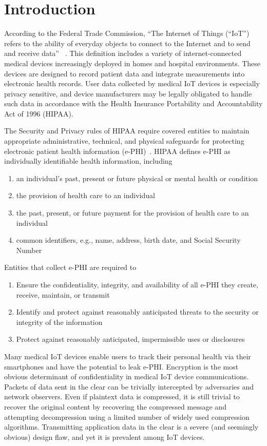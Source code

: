 \section{Introduction}

According to the Federal Trade Commission, ``The Internet of Things (``IoT'') refers to the ability of everyday objects to connect to the Internet and to send and receive data'' ~\cite{ftc}. This definition includes a variety of internet-connected medical devices increasingly deployed in homes and hospital environments. These devices are designed to record patient data and integrate measurements into electronic health records. User data collected by medical IoT devices is especially privacy sensitive, and device manufacturers may be legally obligated to handle such data in accordance with the Health Insurance Portability and Accountability Act of 1996 (HIPAA). 

The Security and Privacy rules of HIPAA require covered entities to maintain appropriate administrative, technical, and physical safeguards for protecting electronic patient health information (e-PHI)~\cite{securityHIPAArule, privacyHIPAArule}. HIPAA defines e-PHI as individually identifiable health information, including
\begin{enumerate}
  \item an individual's past, present or future physical or mental health or condition
  \item the provision of health care to an individual
  \item the past, present, or future payment for the provision of health care to an individual
  \item common identifiers, e.g., name, address, birth date, and  Social Security Number
\end{enumerate}
Entities that collect e-PHI are required to 
\begin{enumerate}
  \item Ensure the confidentiality, integrity, and availability of all e-PHI they create, receive, maintain, or transmit
  \item Identify and protect against reasonably anticipated threats to the security or integrity of the information
  \item Protect against reasonably anticipated, impermissible uses or disclosures
\end{enumerate}

Many medical IoT devices enable users to track their personal health via their smartphones and have the potential to leak e-PHI. 
Encryption is the most obvious determinant of confidentiality in medical IoT device communications. Packets of data sent in the clear can be trivially intercepted by adversaries and network observers. Even if plaintext data is compressed, it is still trivial to recover the original content by recovering the compressed message and attempting decompression using a limited number of widely used compression algorithms. Transmitting application data in the clear is a severe (and seemingly obvious) design flaw, and yet it is prevalent among IoT devices. 

